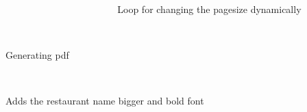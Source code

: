 ~\newline
~\newline
~\newline
~\newline
~\newline
~\newline
~\newline
~\newline
~\newline
~\newline
~\newline
~\newline
~\newline
~\newline
Loop for changing the pagesize dynamically 

~\newline
~\newline
~\newline
~\newline
~\newline
~\newline
~\newline
~\newline
~\newline
~\newline
~\newline
~\newline
~\newline
 

Generating pdf 

~\newline
~\newline
~\newline
~\newline
~\newline
~\newline
~\newline
~\newline
~\newline
~\newline
~\newline
~\newline
 

Adds the restaurant name bigger and bold font 

~\newline
~\newline
~\newline
~\newline
~\newline
~\newline
~\newline
~\newline
~\newline
~\newline
~\newline
 

